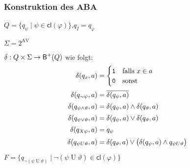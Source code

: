   \begin{frame}
    \frametitle{Konstruktion des ABA}
    
    \begin{Itemize}
      \item
        $Q = \{q_\psi \mid \psi \in \textsf{cl}(\varphi)\}$,\quad $q_I = q_\varphi$
        \parI
      \item
        $\Sigma = 2^{\text{AV}}$
        \parI
      \item
        $\delta : Q \times \Sigma \to \textsf{B}^+(Q)$ wie folgt:
        \begin{align*}
          \delta(q_x,a)                           & = \begin{cases}
                                                       \texttt{1} & \text{falls~} x \in a \\
                                                       \texttt{0} & \text{sonst}
                                                     \end{cases}                                     \\[2pt]
          \delta(q_{\mathord{\sim} \psi}, a)                & = \overline{\delta(q_\psi, a)}                   \\[2pt]
          \delta(q_{\psi \land \vartheta}, a)     & = \delta(q_\psi, a) \land \delta(q_\vartheta, a) \\[2pt]
          \delta(q_{\psi \lor \vartheta}, a)      & = \delta(q_\psi, a) \lor \delta(q_\vartheta, a)  \\[2pt]
          \delta(q_{X\psi}, a)                    & = q_\psi                                         \\[2pt]
          \delta(q_{\psi\mathbin{U}\vartheta}, a) & = \delta(q_\vartheta, a) \lor \big(\delta(q_\psi, a) \land q_{\psi\mathbin{U}\vartheta}\big)
        \end{align*}
        \parI
      \item
        $F = \{q_{\lnot(\psi \mathbin{U} \vartheta)} \mid \lnot(\psi \mathbin{U} \vartheta) \in \textsf{cl}(\varphi)\}$
        \Tafel
    \end{Itemize}

  \end{frame}

